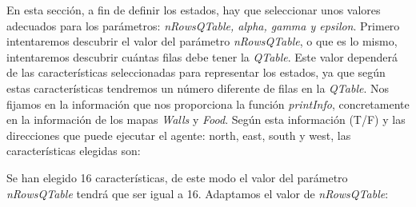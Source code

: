 \documentclass[11pt]{exam}
\begin{document}
En esta sección, a fin de definir los estados, hay que seleccionar unos valores adecuados para los parámetros: \textit{nRowsQTable, alpha, gamma y epsilon}. Primero intentaremos descubrir el valor del parámetro \textit{nRowsQTable}, o que es lo mismo, intentaremos descubrir cuántas filas debe tener la \textit{QTable}. Este valor dependerá de las características seleccionadas para representar los estados, ya que según estas características tendremos un número diferente de filas en la \textit{QTable}. Nos fijamos en la información que nos proporciona la función \textit{printInfo}, concretamente en la información de los mapas \textit{Walls} y \textit{Food}. Según esta información (T/F) y las direcciones que puede ejecutar el agente: north, east, south y west, las características elegidas son:

\begin{parcolumns}{2}
	\colplacechunks
\end{parcolumns}
\vspace*{3mm}

Se han elegido 16 características, de este modo el valor del parámetro \textit{nRowsQTable} tendrá que ser igual a 16. Adaptamos el valor de \textit{nRowsQTable}:
\end{document}
